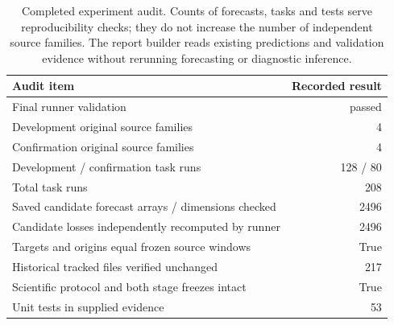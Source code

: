 \begin{table}[t]
\centering\small\setlength{\tabcolsep}{4pt}
\caption{Completed experiment audit. Counts of forecasts, tasks and tests serve reproducibility checks; they do not increase the number of independent source families. The report builder reads existing predictions and validation evidence without rerunning forecasting or diagnostic inference.}\label{tab:validation-audit}
\begin{tabular}{lr}
\toprule
Audit item & Recorded result \\
\midrule
Final runner validation & passed \\
Development original source families & 4 \\
Confirmation original source families & 4 \\
Development / confirmation task runs & 128 / 80 \\
Total task runs & 208 \\
Saved candidate forecast arrays / dimensions checked & 2496 \\
Candidate losses independently recomputed by runner & 2496 \\
Targets and origins equal frozen source windows & True \\
Historical tracked files verified unchanged & 217 \\
Scientific protocol and both stage freezes intact & True \\
Unit tests in supplied evidence & 53 \\
\bottomrule
\end{tabular}
\end{table}
